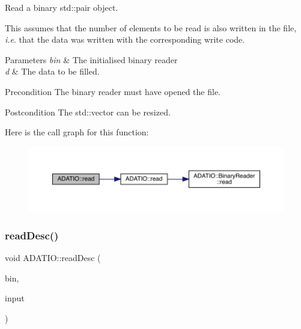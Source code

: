 Read a binary std\+::pair object. 

This assumes that the number of elements to be read is also written in the file, {\itshape i.\+e}. that the data was written with the corresponding write code. 
\begin{DoxyParams}{Parameters}
{\em bin} & The initialised binary reader \\
\hline
{\em d} & The data to be filled.\\
\hline
\end{DoxyParams}
\begin{DoxyPrecond}{Precondition}
The binary reader must have opened the file. 
\end{DoxyPrecond}
\begin{DoxyPostcond}{Postcondition}
The std\+::vector can be resized. 
\end{DoxyPostcond}
Here is the call graph for this function\+:
\nopagebreak
\begin{figure}[H]
\begin{center}
\leavevmode
\includegraphics[width=350pt]{d0/dba/namespaceADATIO_a746a6511817f141011d50005a099feec_cgraph}
\end{center}
\end{figure}
\mbox{\label{namespaceADATIO_af57306a140489d28cd8fa1107d585906}} 
\subsubsection{\texorpdfstring{readDesc()}{readDesc()}}
{\footnotesize\ttfamily void A\+D\+A\+T\+I\+O\+::read\+Desc (\begin{DoxyParamCaption}\item[{\mbox{\hyperlink{classADATIO_1_1BinaryReader}{Binary\+Reader}} \&}]{bin,  }\item[{std\+::string \&}]{input }\end{DoxyParamCaption})}

